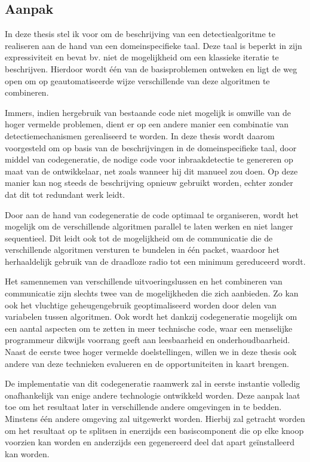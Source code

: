 \documentclass[12pt,a4paper]{article}
\begin{document}
\subsection*{Aanpak}

In deze thesis stel ik voor om de beschrijving van een detectiealgoritme te
realiseren aan de hand van een domeinspecifieke taal. Deze taal is beperkt in
zijn expressiviteit en bevat bv. niet de mogelijkheid om een klassieke iteratie
te beschrijven. Hierdoor wordt \'e\'en van de basisproblemen ontweken en ligt
de weg open om op geautomatiseerde wijze verschillende van deze algoritmen te
combineren.

Immers, indien hergebruik van bestaande code niet mogelijk is omwille van de
hoger vermelde problemen, dient er op een andere manier een combinatie van
detectiemechanismen gerealiseerd te worden. In deze thesis wordt daarom
voorgesteld om op basis van de beschrijvingen in de domeinspecifieke taal, door
middel van codegeneratie, de nodige code voor inbraakdetectie te genereren op
maat van de ontwikkelaar, net zoals wanneer hij dit manueel zou doen. Op deze
manier kan nog steeds de beschrijving opnieuw gebruikt worden, echter zonder
dat dit tot redundant werk leidt.

Door aan de hand van codegeneratie de code optimaal te organiseren, wordt het
mogelijk om de verschillende algoritmen parallel te laten werken en niet langer
sequentieel. Dit leidt ook tot de mogelijkheid om de communicatie die de
verschillende algoritmen versturen te bundelen in \'e\'en packet, waardoor het
herhaaldelijk gebruik van de draadloze radio tot een minimum gereduceerd wordt.

Het samennemen van verschillende uitvoeringslussen en het combineren van
communicatie zijn slechts twee van de mogelijkheden die zich aanbieden. Zo kan
ook het vluchtige geheugengebruik geoptimaliseerd worden door delen van
variabelen tussen algoritmen. Ook wordt het dankzij codegeneratie mogelijk om
een aantal aspecten om te zetten in meer technische code, waar een menselijke
programmeur dikwijls voorrang geeft aan leesbaarheid en onderhoudbaarheid.
Naast de eerste twee hoger vermelde doelstellingen, willen we in deze thesis
ook andere van deze technieken evalueren en de opportuniteiten in kaart brengen.

De implementatie van dit codegeneratie raamwerk zal in eerste instantie
volledig onafhankelijk van enige andere technologie ontwikkeld worden. Deze
aanpak laat toe om het resultaat later in verschillende andere omgevingen in te
bedden. Minstens \'e\'en andere omgeving zal uitgewerkt worden. Hierbij zal
getracht worden om het resultaat op te splitsen in enerzijds een basiscomponent
die op elke knoop voorzien kan worden en anderzijds een gegenereerd deel dat
apart ge\"installeerd kan worden.
\end{document}

